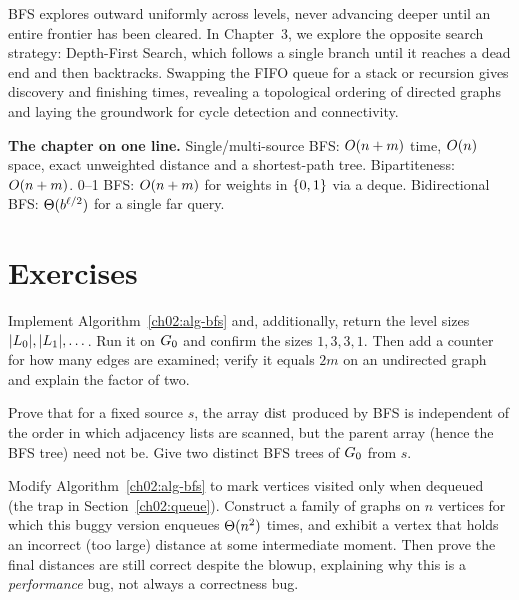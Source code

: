 BFS explores outward uniformly across levels, never advancing deeper until an entire
frontier has been cleared. In Chapter~3, we explore the opposite search strategy:
Depth-First Search, which follows a single branch until it reaches a
dead end and then backtracks. Swapping the FIFO queue for a stack or recursion gives
discovery and finishing times, revealing a topological ordering of directed graphs
and laying the groundwork for cycle detection and connectivity.

\begin{complexitybox}
\textbf{The chapter on one line.}\quad
Single/multi-source BFS: $O(n+m)$ time, $O(n)$ space, exact unweighted
distance and a shortest-path tree. Bipartiteness: $O(n+m)$. 0--1 BFS:
$O(n+m)$ for weights in $\{0,1\}$ via a deque. Bidirectional BFS:
$\Theta(b^{\ell/2})$ for a single far query.
\end{complexitybox}

\section{Exercises}
\label{ch02:exercises}

\begin{exercise}
Implement Algorithm~\ref{ch02:alg-bfs} and, additionally, return the level sizes
$\lvert L_0\rvert,\lvert L_1\rvert,\dots$. Run it on $G_0$ and confirm the sizes
$1,3,3,1$. Then add a counter for how many edges are examined; verify it equals
$2m$ on an undirected graph and explain the factor of two.
\end{exercise}

\begin{exercise}
Prove that for a fixed source $s$, the array $\operatorname{dist}$ produced by BFS is
independent of the order in which adjacency lists are scanned, but the
$\mathrm{parent}$ array (hence the BFS tree) need not be. Give two
distinct BFS trees of $G_0$ from $s$.
\end{exercise}

\begin{exercise}
Modify Algorithm~\ref{ch02:alg-bfs} to mark vertices visited only when dequeued
(the trap in Section~\ref{ch02:queue}). Construct a family of graphs on $n$
vertices for which this buggy version enqueues $\Theta(n^2)$ times, and exhibit a
vertex that holds an incorrect (too large) distance at some intermediate moment.
Then prove the final distances are still correct despite the blowup, explaining
why this is a \emph{performance} bug, not always a correctness bug.
\end{exercise}

